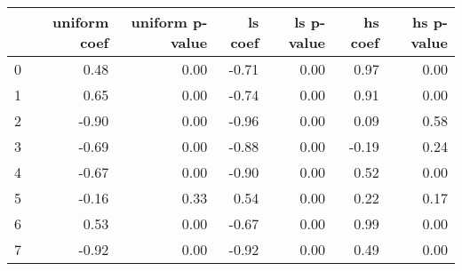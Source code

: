\begin{tabular}{lrrrrrr}
\toprule
 & uniform coef & uniform p-value & ls coef & ls p-value & hs coef & hs p-value \\
\midrule
0 & 0.48 & 0.00 & -0.71 & 0.00 & 0.97 & 0.00 \\
1 & 0.65 & 0.00 & -0.74 & 0.00 & 0.91 & 0.00 \\
2 & -0.90 & 0.00 & -0.96 & 0.00 & 0.09 & 0.58 \\
3 & -0.69 & 0.00 & -0.88 & 0.00 & -0.19 & 0.24 \\
4 & -0.67 & 0.00 & -0.90 & 0.00 & 0.52 & 0.00 \\
5 & -0.16 & 0.33 & 0.54 & 0.00 & 0.22 & 0.17 \\
6 & 0.53 & 0.00 & -0.67 & 0.00 & 0.99 & 0.00 \\
7 & -0.92 & 0.00 & -0.92 & 0.00 & 0.49 & 0.00 \\
\bottomrule
\end{tabular}
